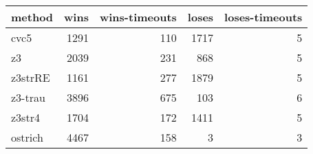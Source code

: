\begin{tabular}{lrrrr}
\hline
 method   &   wins &   wins-timeouts &   loses &   loses-timeouts \\
\hline
 cvc5     &   1291 &             110 &    1717 &                5 \\
 z3       &   2039 &             231 &     868 &                5 \\
 z3strRE  &   1161 &             277 &    1879 &                5 \\
 z3-trau  &   3896 &             675 &     103 &                6 \\
 z3str4   &   1704 &             172 &    1411 &                5 \\
 ostrich  &   4467 &             158 &       3 &                3 \\
\hline
\end{tabular}
